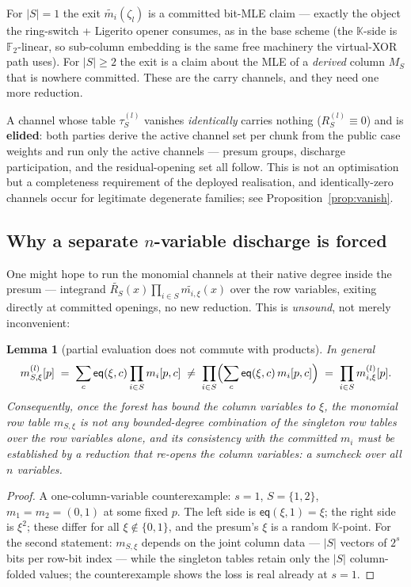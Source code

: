 \documentclass[11pt]{article}
\newcommand{\F}{\mathbb{F}}
\newcommand{\K}{\mathbb{K}}            %
\newcommand{\Ftwo}{\F_2}
\newcommand{\mle}[1]{\widetilde{#1}}
\newcommand{\eq}{\mathsf{eq}}
\theoremstyle{plain}
\newtheorem{lemma}[theorem]{Lemma}
\theoremstyle{definition}
\theoremstyle{remark}
\begin{document}
For $|S|=1$ the exit $\mle{m_i}(\zeta_l)$ is a committed bit-MLE claim ---
exactly the object the ring-switch + Ligerito opener consumes, as in the base
scheme (the $\K$-side is $\Ftwo$-linear, so sub-column embedding is the same
free machinery the virtual-XOR path uses). For $|S|\ge 2$ the exit is a claim
about the MLE of a \emph{derived} column $M_S$ that is nowhere committed.
These are the carry channels, and they need one more reduction.

A channel whose table $\tau^{(l)}_S$ vanishes \emph{identically} carries
nothing ($R^{(l)}_S\equiv 0$) and is \textbf{elided}: both parties derive
the active channel set per chunk from the public case weights and run only
the active channels --- presum groups, discharge participation, and the
residual-opening set all follow. This is not an optimisation but a
completeness requirement of the deployed realisation, and identically-zero
channels occur for legitimate degenerate families; see
Proposition~\ref{prop:vanish}.

\subsection{Why a separate \texorpdfstring{$n$}{n}-variable discharge is forced}\label{sec:whydischarge}

One might hope to run the monomial channels at their native degree inside the
presum --- integrand $\mle{R_S}(x)\prod_{i\in S}\mle{m_{i,\xi}}(x)$ over the
row variables, exiting directly at committed openings, no new reduction. This
is \emph{unsound}, not merely inconvenient:

\begin{lemma}[partial evaluation does not commute with products]\label{lem:noncommute}
In general
\[
  m^{(l)}_{S,\xi}[p] \;=\; \sum_c \eq(\xi,c)\prod_{i\in S}m_i[p,c]
  \;\ne\;
  \prod_{i\in S}\Bigl(\sum_c \eq(\xi,c)\, m_i[p,c]\Bigr)
  \;=\; \prod_{i\in S} m^{(l)}_{i,\xi}[p] .
\]
Consequently, once the forest has bound the column variables to $\xi$, the
monomial row table $m_{S,\xi}$ is not any bounded-degree combination of the
singleton row tables over the row variables alone, and its consistency with
the committed $m_i$ must be established by a reduction that \emph{re-opens
the column variables}: a sumcheck over all $n$ variables.
\end{lemma}

\begin{proof}
A one-column-variable counterexample: $s=1$, $S=\{1,2\}$,
$m_1=m_2=(0,1)$ at some fixed $p$. The left side is
$\eq(\xi,1)=\xi$; the right side is $\xi^2$; these differ for all
$\xi\notin\{0,1\}$, and the presum's $\xi$ is a random $\K$-point. For the
second statement: $m_{S,\xi}$ depends on the joint column data --- $|S|$
vectors of $2^{s}$ bits per row-bit index --- while the singleton tables
retain only the $|S|$ column-folded values; the counterexample shows the
loss is real already at $s=1$.
\end{proof}
\end{document}
